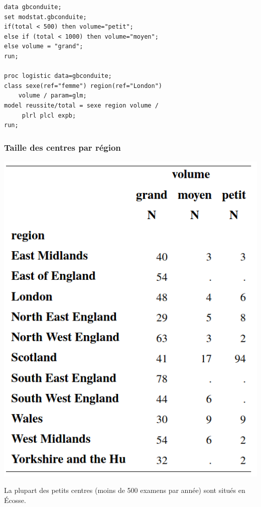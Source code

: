 \documentclass{beamer}
\begin{document}
\begin{frame}[fragile]

\begin{tcolorbox}[colback=white, colframe=hecblue, title=Code SAS pour régression logistique binomiale]
\begin{verbatim}
data gbconduite;
set modstat.gbconduite;
if(total < 500) then volume="petit"; 
else if (total < 1000) then volume="moyen";
else volume = "grand";
run;

proc logistic data=gbconduite;
class sexe(ref="femme") region(ref="London")
    volume / param=glm;
model reussite/total = sexe region volume /
     plrl plcl expb;
run;
\end{verbatim}
\end{tcolorbox}
\end{frame}
\begin{frame}
 \frametitle{Taille des centres par région}
 \begin{center}
  \includegraphics[width = 0.4\linewidth]{img/c4/diapos8-e23}
 \end{center}
{ \small La plupart des petits centres (moins de 500 examens par année) sont situés en Écosse.


}
\end{frame}
\end{document}

